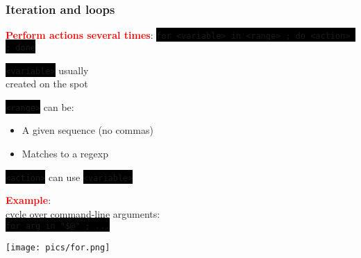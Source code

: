 \documentclass[unknownkeysallowed, 10pt, a4 paper, handout]{beamer}
\newcommand{\focus}[1]{\textbf{\textcolor{red}{#1}}}
\newcommand{\code}[1]{\colorbox{black}{\color{green}\texttt{#1}}}
\newcommand{\sidebyside}[5]{
  \begin{minipage}{#1\textwidth}
    #2
  \end{minipage} #3 \begin{minipage}{#4\textwidth}
    #5
  \end{minipage}
}
\begin{document}
\begin{frame}
  \begin{center}
    \frametitle{Iteration and loops}

    \focus{Perform actions several times}:
    \code{for <variable> in <range> ; do <action> ; done}

    \sidebyside{0.50}{
      \centering
      \code{<variable>} usually\\
      created on the spot

      \vspace{5mm}

      \code{<range>} can be:
      \begin{itemize}
        \item A given sequence (no commas)\\
        \item Matches to a regexp
      \end{itemize}

      \vspace{5mm}

      \code{<action>} can use \code{<variable>}

      \vspace{5mm}

      \focus{Example}:\\
      cycle over command-line arguments:\\
      \code{for arg in "\$@" ; ...}
    }{\hfill}{0.45}{
      \begin{center}
        \texttt{[image: pics/for.png]}
      \end{center}
    }
  \end{center}
\end{frame}
\end{document}
